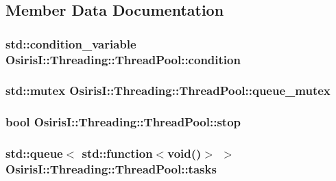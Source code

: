 \subsection{Member Data Documentation}
\hypertarget{class_osiris_i_1_1_threading_1_1_thread_pool_a529f0a8495fadb266bfa7f592f7188fd}{
\subsubsection[{condition}]{\setlength{\rightskip}{0pt plus 5cm}std\-::condition\-\_\-variable Osiris\-I\-::\-Threading\-::\-Thread\-Pool\-::condition\hspace{0.3cm}{\ttfamily [protected]}}}\label{class_osiris_i_1_1_threading_1_1_thread_pool_a529f0a8495fadb266bfa7f592f7188fd}
\hypertarget{class_osiris_i_1_1_threading_1_1_thread_pool_a467c48f19c183557860e1ff2e6506b58}{
\subsubsection[{queue\-\_\-mutex}]{\setlength{\rightskip}{0pt plus 5cm}std\-::mutex Osiris\-I\-::\-Threading\-::\-Thread\-Pool\-::queue\-\_\-mutex\hspace{0.3cm}{\ttfamily [protected]}}}\label{class_osiris_i_1_1_threading_1_1_thread_pool_a467c48f19c183557860e1ff2e6506b58}
\hypertarget{class_osiris_i_1_1_threading_1_1_thread_pool_a6d198b51bc8c0efbff7b8a5986069ddb}{
\subsubsection[{stop}]{\setlength{\rightskip}{0pt plus 5cm}bool Osiris\-I\-::\-Threading\-::\-Thread\-Pool\-::stop\hspace{0.3cm}{\ttfamily [protected]}}}\label{class_osiris_i_1_1_threading_1_1_thread_pool_a6d198b51bc8c0efbff7b8a5986069ddb}
\hypertarget{class_osiris_i_1_1_threading_1_1_thread_pool_ab9247637f8426897721ee766c6fac312}{
\subsubsection[{tasks}]{\setlength{\rightskip}{0pt plus 5cm}std\-::queue$<$ std\-::function$<$void()$>$ $>$ Osiris\-I\-::\-Threading\-::\-Thread\-Pool\-::tasks\hspace{0.3cm}{\ttfamily [protected]}}}\label{class_osiris_i_1_1_threading_1_1_thread_pool_ab9247637f8426897721ee766c6fac312}
